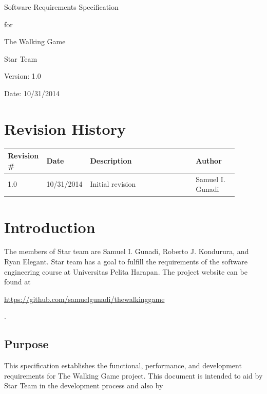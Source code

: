 \documentclass[12pt]{article}
\begin{document}
	\vspace*{2.8 in}
	\begin{huge}
		\begin{center}
			Software Requirements Specification
			\par
			for
			\par
			The Walking Game
			\par
		\end{center}
	\end{huge}
	\vspace*{2.5 in}
	\begin{large}
		\begin{flushright}
			Star Team
			
			Version: 1.0
			
			Date: 10/31/2014
		\end{flushright}
	\end{large}
	
	\clearpage
	\section*{Revision History}
	\begin{flushleft}
		\begin{tabular}{|p{0.14\linewidth}|p{0.12\linewidth}|p{0.45\linewidth}|p{0.18\linewidth}|}
			\hline
			\textbf{Revision \#} & \textbf{Date} & \textbf{Description} & \textbf{Author} \\\hline
			1.0 & 10/31/2014 & Initial revision & Samuel I. Gunadi \\\hline
		\end{tabular}
	\end{flushleft}
	\clearpage
	
	\clearpage
	\clearpage
	\setcounter{page}{0}
	
	\section{Introduction}
	The members of Star team are Samuel I. Gunadi, Roberto J. Kondurura, and Ryan Elegant. Star team has a goal to fulfill the requirements of the software engineering course at Universitas Pelita Harapan. The project website can be found at \begin{footnotesize}\url{https://github.com/samuelgunadi/thewalkinggame}\end{footnotesize}.
	
	\subsection{Purpose}
	This specification establishes the functional, performance, and development requirements for The Walking Game project. This document is intended to aid by Star Team in the development process and also by 
	
\end{document}
